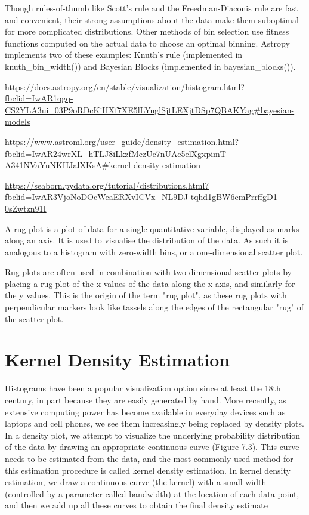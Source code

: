 Though rules-of-thumb like Scott’s rule and the Freedman-Diaconis rule are fast and convenient, their strong assumptions about the data make them suboptimal for more complicated distributions. Other methods of bin selection use fitness functions computed on the actual data to choose an optimal binning. Astropy implements two of these examples: Knuth’s rule (implemented in knuth\_bin\_width()) and Bayesian Blocks (implemented in bayesian\_blocks()).

\url{https://docs.astropy.org/en/stable/visualization/histogram.html?fbclid=IwAR1qgq-CS2YLA3ui_03P9oRDcKiHXf7XE5lLYuglSjtLEXjtDSp7QBAKYag#bayesian-models}

\url{https://www.astroml.org/user_guide/density_estimation.html?fbclid=IwAR24wrXL_hTLJ8iLkzfMczUc7nUAc5elXgxpimT-A341NVaYuNKHJalXKsA#kernel-density-estimation}

\url{https://seaborn.pydata.org/tutorial/distributions.html?fbclid=IwAR3VjoNoDOcWeaERXvICVx_NL9DJ-tqhd1gBW6emPrrffgD1-0sZwtzn91I}


A rug plot is a plot of data for a single quantitative variable, displayed as marks along an axis. It is used to visualise the distribution of the data. As such it is analogous to a histogram with zero-width bins, or a one-dimensional scatter plot.

Rug plots are often used in combination with two-dimensional scatter plots by placing a rug plot of the x values of the data along the x-axis, and similarly for the y values. This is the origin of the term "rug plot", as these rug plots with perpendicular markers look like tassels along the edges of the rectangular "rug" of the scatter plot.

\section{Kernel Density Estimation}\label{sec:kde}

Histograms have been a popular visualization option since at least the 18th century, in part because they are easily generated by hand. More recently, as extensive computing power has become available in everyday devices such as laptops and cell phones, we see them increasingly being replaced by density plots. In a density plot, we attempt to visualize the underlying probability distribution of the data by drawing an appropriate continuous curve (Figure 7.3). This curve needs to be estimated from the data, and the most commonly used method for this estimation procedure is called kernel density estimation. In kernel density estimation, we draw a continuous curve (the kernel) with a small width (controlled by a parameter called bandwidth) at the location of each data point, and then we add up all these curves to obtain the final density estimate

